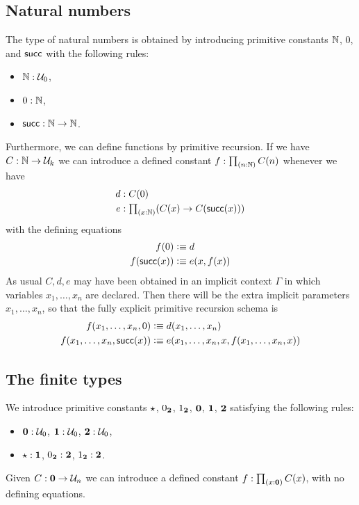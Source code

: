 \subsection{Natural numbers}

The type of natural numbers is obtained by introducing primitive constants
$\mathbb{N}$, $0$, and $\mathsf{succ}$ with the following rules:
%
\begin{itemize}
  \item $\mathbb{N} : \mathcal{U}_0$,
  \item $0:\mathbb{N}$,
  \item $\mathsf{succ}:\mathbb{N}\rightarrow \mathbb{N}$.
\end{itemize}
%
Furthermore, we can define functions by primitive recursion.  If we have
$C : \mathbb{N} \rightarrow \mathcal{U}_k $ we can introduce a defined constant $f:\tprd{n:\N}C(n)$ whenever we have
%
\begin{align*}
  d & : C(0) \\
  e & : \tprd{x:\N}(C(x)\rightarrow C(\suc (x)))
\end{align*}
%
with the defining equations
%
\begin{align*}
  f(0) & \vcentcolon\equiv d \\
  f(\mathsf{succ} (x)) & \vcentcolon\equiv e(x,f(x))
\end{align*}
%
As usual $C,d,e$ may have been obtained in an implicit context $\Gamma$ in which variables $x_1,\ldots,x_n$ are declared.  Then there will be the extra implicit parameters $x_1,\ldots,x_n$, so that the fully explicit primitive recursion schema is
%
\begin{align*}
  f(x_1,\dots,x_n,0) & \vcentcolon\equiv d(x_1,\dots,x_n) \\
  f(x_1,\dots,x_n,\mathsf{succ} (x)) & \vcentcolon\equiv e(x_1,\dots,x_n,x,f(x_1,\dots,x_n,x))
\end{align*}

\subsection{The finite types}

We introduce primitive constants $\star$, ${0_{\mathbf{2}}}$, ${1_{\mathbf{2}}}$, $\mathbf{0}$,
$\mathbf{1}$, $\mathbf{2}$ satisfying the following rules:
%
\begin{itemize}
\item $\mathbf{0} : \mathcal{U}_0$, $\mathbf{1} : \mathcal{U}_0$, $\mathbf{2} : \mathcal{U}_0$,
\item $\star:\mathbf{1}$, ${0_{\mathbf{2}}}:\mathbf{2}$, ${1_{\mathbf{2}}}:\mathbf{2}$.
\end{itemize}

Given $C : \mathbf{0} \rightarrow \mathcal{U}_n$ we can introduce a defined constant $f:\tprd{x:\emptyt} C(x)$, with no defining equations.

